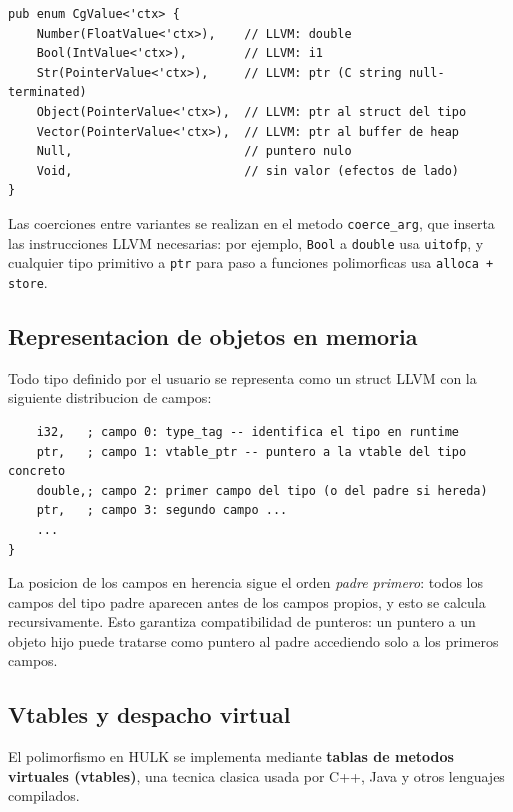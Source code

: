 \documentclass[12pt,a4paper]{article}
\begin{document}
\begin{lstlisting}[style=rust, caption={Enum CgValue -- representacion de valores HULK en LLVM}]
pub enum CgValue<'ctx> {
    Number(FloatValue<'ctx>),    // LLVM: double
    Bool(IntValue<'ctx>),        // LLVM: i1
    Str(PointerValue<'ctx>),     // LLVM: ptr (C string null-terminated)
    Object(PointerValue<'ctx>),  // LLVM: ptr al struct del tipo
    Vector(PointerValue<'ctx>),  // LLVM: ptr al buffer de heap
    Null,                        // puntero nulo
    Void,                        // sin valor (efectos de lado)
}
\end{lstlisting}

Las coerciones entre variantes se realizan en el metodo \texttt{coerce\_arg}, que
inserta las instrucciones LLVM necesarias: por ejemplo, \texttt{Bool} a \texttt{double}
usa \texttt{uitofp}, y cualquier tipo primitivo a \texttt{ptr} para paso a funciones
polimorficas usa \texttt{alloca + store}.

\subsection{Representacion de objetos en memoria}

Todo tipo definido por el usuario se representa como un struct LLVM con la siguiente
distribucion de campos:

\begin{lstlisting}[style=llvmir, caption={Layout de struct para un tipo HULK con campos},
  numbers=none]
%MyType = type {
    i32,   ; campo 0: type_tag -- identifica el tipo en runtime
    ptr,   ; campo 1: vtable_ptr -- puntero a la vtable del tipo concreto
    double,; campo 2: primer campo del tipo (o del padre si hereda)
    ptr,   ; campo 3: segundo campo ...
    ...
}
\end{lstlisting}

La posicion de los campos en herencia sigue el orden \textit{padre primero}: todos los
campos del tipo padre aparecen antes de los campos propios, y esto se calcula
recursivamente. Esto garantiza compatibilidad de punteros: un puntero a un objeto hijo
puede tratarse como puntero al padre accediendo solo a los primeros campos.

\subsection{Vtables y despacho virtual}

El polimorfismo en HULK se implementa mediante \textbf{tablas de metodos virtuales
(vtables)}, una tecnica clasica usada por C++, Java y otros lenguajes compilados.
\end{document}
